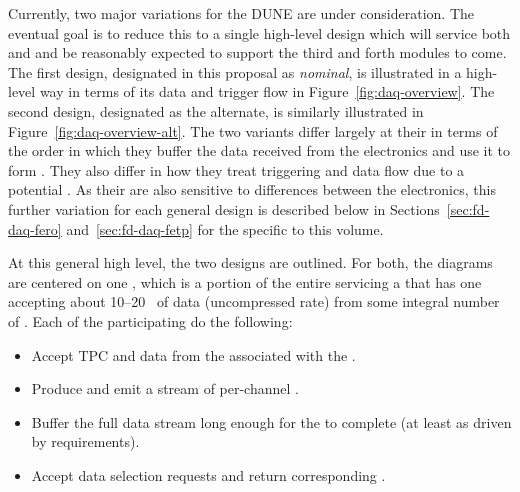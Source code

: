 Currently, two major variations for the DUNE  are under consideration. %
The eventual goal is to reduce this to a single high-level design
which will service both \single and \dual {} and be reasonably
expected to support the third and forth modules to come.
The first design, designated in this proposal as \textit{nominal}, is
illustrated in a high-level way in terms of its data and trigger flow
in Figure~\ref{fig:daq-overview}. 
The second design, designated as the alternate, is similarly
illustrated in Figure~\ref{fig:daq-overview-alt}. 
The two variants differ largely at their  in terms of the
order in which they buffer the data received from the  
electronics and use it to form . 
They also differ in how they treat triggering and data flow due to a
potential . 
As their  are also sensitive to differences between the
 electronics, this further variation for each general
design is described below in Sections~\ref{sec:fd-daq-fero}
and~\ref{sec:fd-daq-fetp} for the   specific to this volume.

At this general high level, the two designs are outlined. %
For both, the diagrams are %
centered on one 
, which is a portion of the entire  servicing a
 that has one  accepting about
\numrange{10}{20}~\si{\Gbps} of data (uncompressed rate) from some integral
number of . 
Each of the participating  do the following: %
\begin{itemize}
\item Accept TPC and  data from the  associated with the .
\item Produce and emit a stream of per-channel .
\item Buffer the full data stream long enough for the  to complete (at least \snbpretime as driven by  requirements).
\item Accept data selection requests and return corresponding .
\end{itemize}

